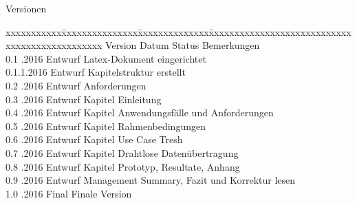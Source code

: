 
\null
\vfill

\begin{Large}
Versionen
\end{Large}

\fontsize{10pt}{18pt}\selectfont
\begin{tabbing}
xxxxxxxxxxx\=xxxxxxxxxxxxxxx\=xxxxxxxxxxxxxx\=xxxxxxxxxxxxxxxxxxxxxxxxxxxxxxxxxxxxxxxxxxxxxxx \kill
Version	\> Datum	\> Status		\> Bemerkungen		\\
0.1	.2016	\> Entwurf		\> Latex-Dokument eingerichtet	\\
0.1.1.2016	\> Entwurf		\> Kapitelstruktur erstellt \\
0.2	.2016	\> Entwurf		\> Anforderungen \\
0.3	.2016	\> Entwurf		\> Kapitel Einleitung \\
0.4	.2016	\> Entwurf		\> Kapitel Anwendungsfälle und Anforderungen \\
0.5	.2016	\> Entwurf		\> Kapitel Rahmenbedingungen \\
0.6	.2016	\> Entwurf		\> Kapitel Use Case Tresh \\
0.7	.2016	\> Entwurf		\> Kapitel Drahtlose Datenübertragung \\
0.8	.2016	\> Entwurf		\> Kapitel Prototyp, Resultate, Anhang \\
0.9	.2016	\> Entwurf		\> Management Summary, Fazit und Korrektur lesen \\
1.0	.2016	\> Final		\> Finale Version \\
\end{tabbing}
